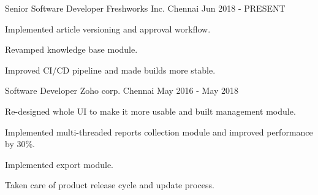 
\begin{cventries}
  \cventry
    {Senior Software Developer} %
    {Freshworks Inc.} %
    {Chennai} %
    {Jun 2018 - PRESENT} %
    {
      \begin{cvitems} %
        \item {Implemented article versioning and approval workflow.}
        \item {Revamped knowledge base module.}
        \item {Improved CI/CD pipeline and made builds more stable.}
      \end{cvitems}
    }

  \cventry
    {Software Developer} %
    {Zoho corp.} %
    {Chennai} %
    {May 2016 - May 2018} %
    {
      \begin{cvitems} %
        \item {Re-designed whole UI to make it more usable and built management module.}
        \item {Implemented multi-threaded reports collection module and improved performance by 30\%.}
        \item {Implemented export module.}
        \item {Taken care of product release cycle and update process.}
      \end{cvitems}
    }    
\end{cventries}
